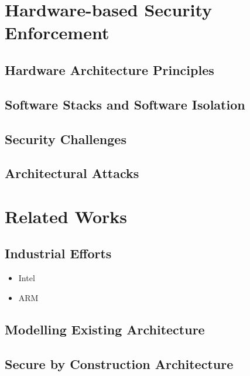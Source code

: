 \documentclass[
11pt, %
english, %
singlespacing, %
headsepline, %
]{MastersDoctoralThesis} %
\begin{document}



\chapter{Hardware-based Security Enforcement}

\section{Hardware Architecture Principles}

\section{Software Stacks and Software Isolation}

\section{Security Challenges}

\section{Architectural Attacks}

\chapter{Related Works}

\section{Industrial Efforts}

\begin{itemize}
\item Intel
\item ARM
\end{itemize}

\section{Modelling Existing Architecture}

\section{Secure by Construction Architecture}
\end{document}

